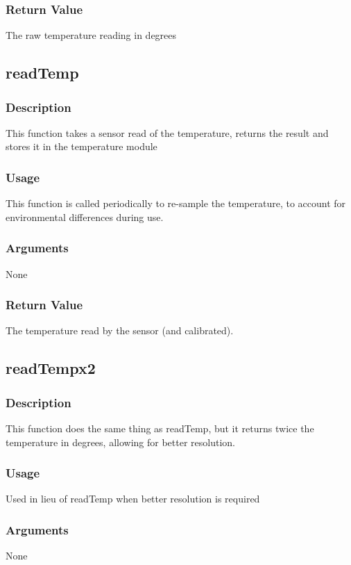 \documentclass[]{report}
\begin{document}
\subsubsection{Return Value}
The raw temperature reading in degrees

\subsection{readTemp}
\subsubsection{Description}
This function takes a sensor read of the temperature, returns the result and stores it in the temperature module

\subsubsection{Usage}
This function is called periodically to re-sample the temperature, to account for environmental differences during use.

\subsubsection{Arguments}
None

\subsubsection{Return Value}
The temperature read by the sensor (and calibrated).

\subsection{readTempx2}
\subsubsection{Description}
This function does the same thing as readTemp, but it returns twice the temperature in degrees, allowing for better resolution.

\subsubsection{Usage}
Used in lieu of readTemp when better resolution is required

\subsubsection{Arguments}
None
\end{document}
